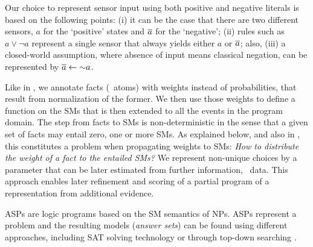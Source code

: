 \documentclass[x11names]{tlp}
\renewcommand{\cite}{\citep}
\begin{document}
Our choice to represent sensor input using both positive and negative literals is based on the following points: 
(i) it can be the case that there are two different sensors, $a$ for the `positive' states and $\overline{a}$ for the `negative';
(ii) rules such as $a \vee \neg a$ represent a single sensor that always yields either $a$ or $\overline{a}$; also, 
(iii) a closed-world assumption, where absence of input means classical negation, can be represented by $\overline{a} \leftarrow \operatorname{\sim\!} a$. 


%
%
%
Like in \lpmln, we annotate facts (\ie\ atoms) with weights \cite{lee2017lpmln} instead of probabilities, that result from normalization of the former.
We then use those weights to define a function on the \aclp{SM} that is then extended to all the events in the program domain.
The step from facts to \acp{SM} is non-deterministic in the sense that a given set of facts may entail zero, one or more \acp{SM}.
As explained below, and also in \cite{verreet2022inference,pajunen2021solution,cozman2020joy,baral2009probabilistic}, this constitutes a problem when propagating weights to \aclp{SM}: \emph{How to distribute the weight of a fact to the entailed \acp{SM}?}
We represent non-unique choices by a parameter that can be later estimated from further information, \ie\ data.
This approach enables later refinement and scoring of a partial program of a representation from additional evidence.
%

\Acp{ASP} \cite{lifschitz2002answer,lifschitz2008twelve} are logic programs based on the \acl{SM} semantics of \acp{NP}. 
\Acp{ASP} represent a problem and the resulting models (\emph{answer sets}) can be found using different approaches, including SAT solving technology \cite{gebser2011potassco,adrian2018asp,niemela1997smodels} or through top-down searching \cite{alberti2017cplint,arias2020justifications,marple2017computing}.
\end{document}
